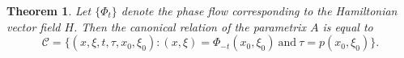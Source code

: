 \documentclass{article}
\theoremstyle{plain}
\newtheorem{theorem}{Theorem}
\theoremstyle{remark}
\theoremstyle{definition}
\DeclareMathOperator{\RR}{\mathbb{R}}
\begin{document}
\begin{comment}
How about uniqueness? If $\varphi$ is \emph{any} solution satisfying the required initial conditions, then the section $\tilde{\Lambda} = \{ (x, \nabla_x \varphi(x)) \}$ is a Lagrangian submanifold of $T^* \RR^d$, contained in $\Sigma$, and containing $\Pi$. But $\Lambda$ is the \emph{unique} such Lagrangian submanifold of $T^* \RR^d$, since any coisotropic manifold has a unique foliation into Lagrangian submanifolds. Thus $\Lambda = \tilde{\Lambda}$, and the uniqueness of the parameterization of Lagrangian sections implies that $\varphi$ is the phase function constructed in the last paragraph.

Notice how this geometry gives us a useful characterization of $\varphi$. To calculate $\nabla_x \varphi(x)$, it suffices to find the unique point on $\Lambda$ that lies above $x$, and the projection onto the $\xi$-variable will give the gradient. We will now use this property to characterize the canonical relation of the parametrix $A$.

\end{comment}

\begin{theorem}
	Let $\{ \Phi_t \}$ denote the phase flow corresponding to the Hamiltonian vector field $H$. Then the canonical relation of the parametrix $A$ is equal to
	\[ \mathcal{C} = \Big\{ (x,\xi,t,\tau,x_0,\xi_0) : (x,\xi) = \Phi_{-t}(x_0,\xi_0)\ \text{and}\ \tau = p(x_0,\xi_0) \Big\}. \]
\end{theorem}
\end{document}
